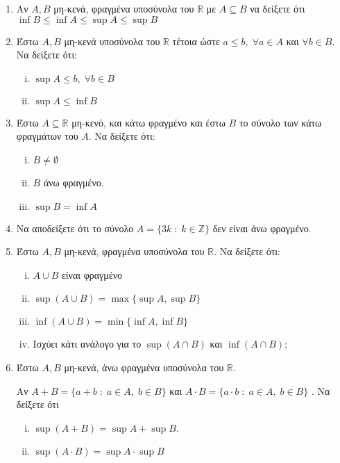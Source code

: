 \begin{enumerate}
    \item Αν $ A,B $ μη-κενά, φραγμένα  υποσύνολα του $ \mathbb{R} $ με 
      $ A \subseteq B $ να δείξετε ότι $ \inf B \leq \inf A \leq 
      \sup A \leq \sup B$

    \item Έστω $ A, B $ μη-κενά υποσύνολα του $ \mathbb{R} $ τέτοια ώστε 
      $ a \leq b, \; \forall a \in A $ και $ \forall b \in B $.
      Να δείξετε ότι:
      \begin{enumerate}[i)]
        \item $ \sup A \leq b, \;  \forall b \in B $
        \item $ \sup A \leq \inf B $
      \end{enumerate}

    \item Έστω $ A \subseteq \mathbb{R} $ μη-κενό, και κάτω φραγμένο και έστω 
      $ B $ το σύνολο των κάτω φραγμάτων του $A$. Να δείξετε ότι:
      \begin{enumerate}[i)]
        \item $ B \neq \emptyset $
        \item $B$ άνω φραγμένο.
        \item $ \sup B = \inf A $
      \end{enumerate}

    \item \label{ask:3z} Να αποδείξετε ότι το σύνολο 
      $ A = \{ 3k \; : \; k \in \mathbb{Z} \} $ δεν είναι άνω φραγμένο.

    \item Έστω $ A,B $ μη-κενά, φραγμένα υποσύνολα του $ \mathbb{R} $. Να 
      δείξετε ότι:
      \begin{enumerate}[i)]
        \item $ A \cup B  $ είναι φραγμένο
        \item $ \sup {(A\cup B)} = \max \{ \sup A, \sup B \} $
        \item $ \inf {(A\cup B)} = \min \{ \inf A, \inf B \} $
        \item Ισχύει κάτι ανάλογο για το $ \sup {(A\cap B)} $ και 
          $ \inf {(A\cap B)} $;
      \end{enumerate}

    \item Έστω $ A, B $ μη-κενά, άνω φραγμένα υποσύνολα του $ \mathbb{R} $.

      Αν $ A+B = \{ a+b \; : \; a \in A, \; b\in B \} $ και $A \cdot B = 
      \{ a\cdot b \; : \; a \in A, \; b \in B\}$ . Να δείξετε ότι 
      \begin{enumerate}[i)]
        \item $ \sup {(A+B)} = \sup A + \sup B $.
        \item $ \sup {(A\cdot B)} = \sup A \cdot \sup B $
      \end{enumerate}


\end{enumerate}

